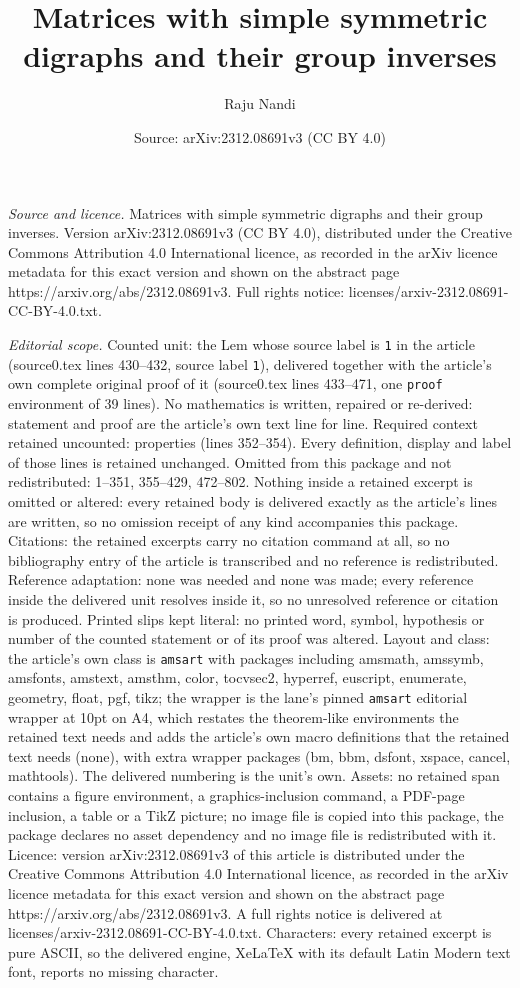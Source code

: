 \documentclass[10pt,a4paper]{amsart}
\title[Matrices with simple symmetric digraphs and their group inve]{Matrices with simple symmetric digraphs and their group inverses}
\author{Raju Nandi}
\date{Source: arXiv:2312.08691v3 (CC BY 4.0)}
\begin{document}
\maketitle

\noindent\emph{Source and licence.} Matrices with simple symmetric digraphs and their group inverses. Version arXiv:2312.08691v3 (CC BY 4.0), distributed under the Creative Commons Attribution 4.0 International licence, as recorded in the arXiv licence metadata for this exact version and shown on the abstract page https://arxiv.org/abs/2312.08691v3. Full rights notice: licenses/arxiv-2312.08691-CC-BY-4.0.txt.\par\smallskip

\noindent\textit{Editorial scope.} Counted unit: the Lem whose source label is \texttt{1} in the article (source0.tex lines 430--432, source label \texttt{1}), delivered together with the article's own complete original proof of it (source0.tex lines 433--471, one \texttt{proof} environment of 39 lines). No mathematics is written, repaired or re-derived: statement and proof are the article's own text line for line. Required context retained uncounted: properties (lines 352--354). Every definition, display and label of those lines is retained unchanged. Omitted from this package and not redistributed: 1--351, 355--429, 472--802. Nothing inside a retained excerpt is omitted or altered: every retained body is delivered exactly as the article's lines are written, so no omission receipt of any kind accompanies this package. Citations: the retained excerpts carry no citation command at all, so no bibliography entry of the article is transcribed and no reference is redistributed. Reference adaptation: none was needed and none was made; every reference inside the delivered unit resolves inside it, so no unresolved reference or citation is produced. Printed slips kept literal: no printed word, symbol, hypothesis or number of the counted statement or of its proof was altered. Layout and class: the article's own class is \texttt{amsart} with packages including amsmath, amssymb, amsfonts, amstext, amsthm, color, tocvsec2, hyperref, euscript, enumerate, geometry, float, pgf, tikz; the wrapper is the lane's pinned \texttt{amsart} editorial wrapper at 10pt on A4, which restates the theorem-like environments the retained text needs and adds the article's own macro definitions that the retained text needs (none), with extra wrapper packages (bm, bbm, dsfont, xspace, cancel, mathtools). The delivered numbering is the unit's own. Assets: no retained span contains a figure environment, a graphics-inclusion command, a PDF-page inclusion, a table or a TikZ picture; no image file is copied into this package, the package declares no asset dependency and no image file is redistributed with it. Licence: version arXiv:2312.08691v3 of this article is distributed under the Creative Commons Attribution 4.0 International licence, as recorded in the arXiv licence metadata for this exact version and shown on the abstract page https://arxiv.org/abs/2312.08691v3. A full rights notice is delivered at licenses/arxiv-2312.08691-CC-BY-4.0.txt. Characters: every retained excerpt is pure ASCII, so the delivered engine, XeLaTeX with its default Latin Modern text font, reports no missing character.
\end{document}
